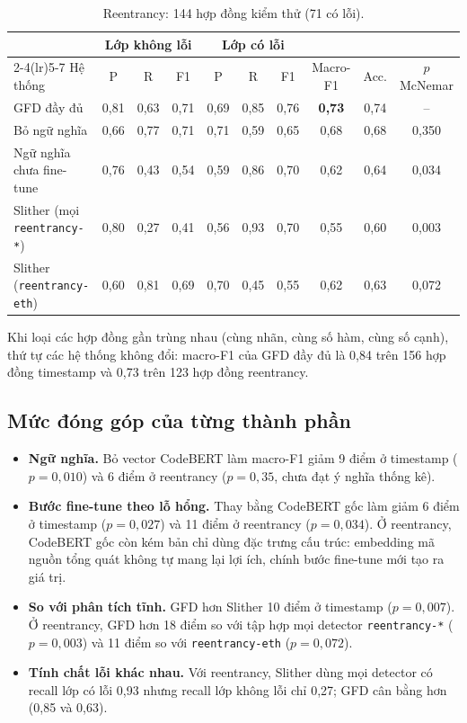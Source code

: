\documentclass[12pt,a4paper]{article}
\newcommand{\code}[1]{\texttt{#1}}
\begin{document}
\begin{table}[H]\centering\small
\caption{Reentrancy: 144 hợp đồng kiểm thử (71 có lỗi).}\label{tab:re}
\setlength{\tabcolsep}{4pt}
\begin{tabular}{lccccccccc}
\toprule
 & \multicolumn{3}{c}{Lớp không lỗi} & \multicolumn{3}{c}{Lớp có lỗi} & & & \\
\cmidrule(lr){2-4}\cmidrule(lr){5-7}
Hệ thống & P & R & F1 & P & R & F1 & Macro-F1 & Acc. & $p$ McNemar\\
\midrule
GFD đầy đủ & 0{,}81 & 0{,}63 & 0{,}71 & 0{,}69 & 0{,}85 & 0{,}76 & \textbf{0{,}73} & 0{,}74 & --\\
Bỏ ngữ nghĩa & 0{,}66 & 0{,}77 & 0{,}71 & 0{,}71 & 0{,}59 & 0{,}65 & 0{,}68 & 0{,}68 & 0{,}350\\
Ngữ nghĩa chưa fine-tune & 0{,}76 & 0{,}43 & 0{,}54 & 0{,}59 & 0{,}86 & 0{,}70 & 0{,}62 & 0{,}64 & 0{,}034\\
Slither (mọi \code{reentrancy-*}) & 0{,}80 & 0{,}27 & 0{,}41 & 0{,}56 & 0{,}93 & 0{,}70 & 0{,}55 & 0{,}60 & 0{,}003\\
Slither (\code{reentrancy-eth}) & 0{,}60 & 0{,}81 & 0{,}69 & 0{,}70 & 0{,}45 & 0{,}55 & 0{,}62 & 0{,}63 & 0{,}072\\
\bottomrule
\end{tabular}
\end{table}

Khi loại các hợp đồng gần trùng nhau (cùng nhãn, cùng số hàm, cùng số cạnh), thứ tự các hệ thống không đổi: macro-F1 của GFD đầy đủ là 0{,}84 trên 156 hợp đồng timestamp và 0{,}73 trên 123 hợp đồng reentrancy.

\subsection{Mức đóng góp của từng thành phần}
\begin{itemize}
\item \textbf{Ngữ nghĩa.} Bỏ vector CodeBERT làm macro-F1 giảm 9 điểm ở timestamp ($p = 0{,}010$) và 6 điểm ở reentrancy ($p = 0{,}35$, chưa đạt ý nghĩa thống kê).
\item \textbf{Bước fine-tune theo lỗ hổng.} Thay bằng CodeBERT gốc làm giảm 6 điểm ở timestamp ($p = 0{,}027$) và 11 điểm ở reentrancy ($p = 0{,}034$). Ở reentrancy, CodeBERT gốc còn kém bản chỉ dùng đặc trưng cấu trúc: embedding mã nguồn tổng quát không tự mang lại lợi ích, chính bước fine-tune mới tạo ra giá trị.
\item \textbf{So với phân tích tĩnh.} GFD hơn Slither 10 điểm ở timestamp ($p = 0{,}007$). Ở reentrancy, GFD hơn 18 điểm so với tập hợp mọi detector \code{reentrancy-*} ($p = 0{,}003$) và 11 điểm so với \code{reentrancy-eth} ($p = 0{,}072$).
\item \textbf{Tính chất lỗi khác nhau.} Với reentrancy, Slither dùng mọi detector có recall lớp có lỗi 0{,}93 nhưng recall lớp không lỗi chỉ 0{,}27; GFD cân bằng hơn (0{,}85 và 0{,}63).
\end{itemize}
\end{document}
